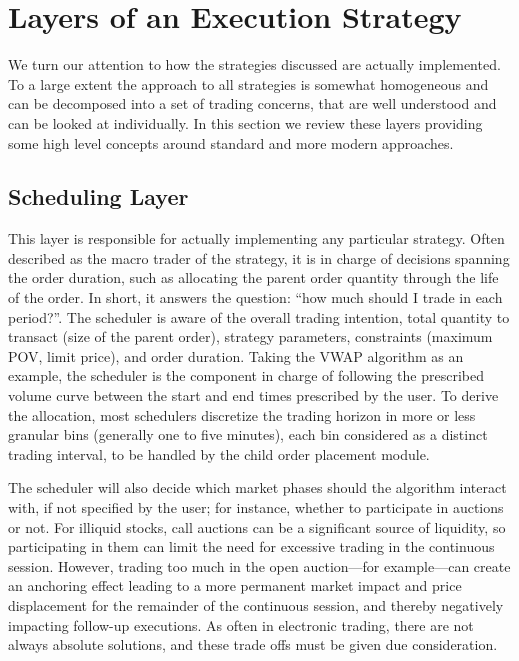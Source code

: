 \section{Layers of an Execution Strategy}

We turn our attention to how the strategies discussed are actually implemented. To a large extent the approach to all strategies is somewhat homogeneous and can be decomposed into a set of trading concerns, that are well understood and can be looked at individually. In this section we review these layers providing some high level concepts around standard and more modern approaches.


\subsection{Scheduling Layer}

This layer is responsible for actually implementing any particular strategy. Often described as the macro trader of the strategy, it is in charge of decisions spanning the order duration, such as allocating the parent order quantity through the life of the order. In short, it answers the question: ``how much should I trade in each period?''. The scheduler is aware of the overall trading intention, total quantity to transact (size of the parent order), strategy parameters, constraints (maximum POV, limit price), and order duration. Taking the VWAP algorithm as an example, the scheduler is the component in charge of following the prescribed volume curve between the start and end times prescribed by the user. To derive the allocation, most schedulers discretize the trading horizon in more or less granular bins (generally one to five minutes), each bin considered as a distinct trading interval, to be handled by the child order placement module.


The scheduler will also decide which market phases should the algorithm interact with, if not specified by the user; for instance, whether to participate in auctions or not. For illiquid stocks, call auctions can be a significant source of liquidity, so participating in them can limit the need for excessive trading in the continuous session. However, trading too much in the open auction---for example---can create an anchoring effect leading to a more permanent market impact and price displacement for the remainder of the continuous session, and thereby negatively impacting follow-up executions. As often in electronic trading, there are not always absolute solutions, and these trade offs must be given due consideration.


